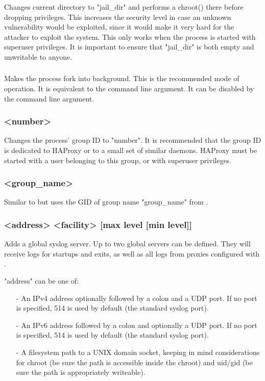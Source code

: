 Changes current directory to "jail\_dir" and performs a chroot() there before
dropping privileges. This increases the security level in case an unknown
vulnerability would be exploited, since it would make it very hard for the
attacker to exploit the system. This only works when the process is started
with superuser privileges. It is important to ensure that "jail\_dir" is both
empty and unwritable to anyone.
  
\subsubsection[daemon]{}

Makes the process fork into background. This is the recommended mode of
operation. It is equivalent to the command line  argument. It can be
disabled by the command line  argument.
  
\subsubsection[gid]{ <number>}

Changes the process' group ID to "number". It is recommended that the group
ID is dedicated to HAProxy or to a small set of similar daemons. HAProxy must
be started with a user belonging to this group, or with superuser privileges.
  
\subsubsection[group]{ <group\_name>}

Similar to  but uses the GID of group name "group\_name" from .

\subsubsection[log]{ <address> <facility> [max level [min level]]}

Adds a global syslog server. Up to two global servers can be defined. They
will receive logs for startups and exits, as well as all logs from proxies
configured with .

"address" can be one of:

\begin{itemize}
  \item[-] An IPv4 address optionally followed by a colon and a UDP port. If
        no port is specified, 514 is used by default (the standard syslog
        port).

  \item[-] An IPv6 address followed by a colon and optionally a UDP port. If
        no port is specified, 514 is used by default (the standard syslog
        port).

  \item[-] A filesystem path to a UNIX domain socket, keeping in mind
        considerations for chroot (be sure the path is accessible inside
        the chroot) and uid/gid (be sure the path is appropriately
        writeable).
\end{itemize}


